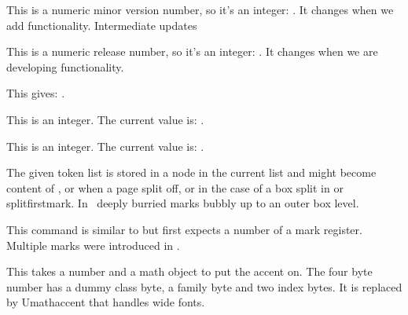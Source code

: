 \stopnewprimitive

\startnewprimitive[title={\prm {luametatexminorversion}}]

This is a numeric minor version number, so it's an integer: \the
\luametatexminorversion. It changes when we add functionality. Intermediate
updates

\stopnewprimitive

\startnewprimitive[title={\prm {luametatexrelease}}]

This is a numeric release number, so it's an integer: \the\luametatexrelease. It
changes when we are developing functionality.

\stopnewprimitive

\startnewprimitive[title={\prm {luatexbanner}}]

This gives: {\tttf \luatexbanner}.

\stopnewprimitive

\startnewprimitive[title={\prm {luatexrevision}}]

This is an integer. The current value is: {\tttf \number\luatexrevision}.

\stopnewprimitive

\startnewprimitive[title={\prm {luatexversion}}]

This is an integer. The current value is: {\tttf \number\luatexversion}.

\stopnewprimitive

\startoldprimitive[title={\prm {mark}}][obsolete=yes]

The given token list is stored in a node in the current list and might become
content of ,  or  when a page split
off, or in the case of a box split in  or \prm
{splitfirstmark}. In \LUAMETATEX\ deeply burried marks bubbly up to an outer box
level.

\stopoldprimitive

\startoldprimitive[title={\prm {marks}}]

This command is similar to  but first expects a number of a mark
register. Multiple marks were introduced in \ETEX.

\stopoldprimitive

\startoldprimitive[title={\prm {mathaccent}}][obsolete=yes]

This takes a number and a math object to put the accent on. The four byte number
has a dummy class byte, a family byte and two index bytes. It is replaced by \prm
{Umathaccent} that handles wide fonts.

